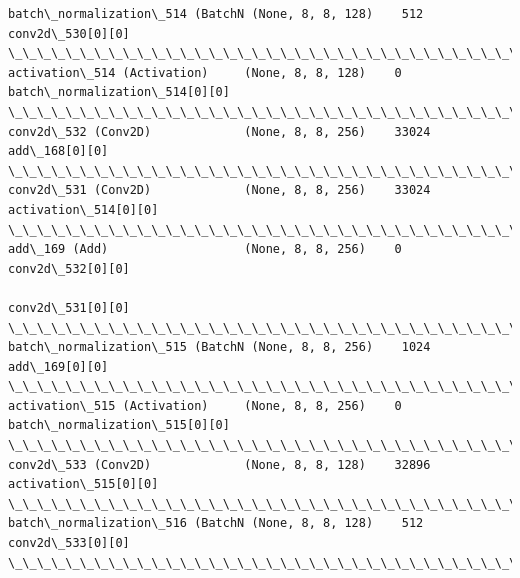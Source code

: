 \documentclass[11pt]{article}
\begin{document}
\begin{Verbatim}[commandchars=\\\{\}]
batch\_normalization\_514 (BatchN (None, 8, 8, 128)    512         conv2d\_530[0][0]                 
\_\_\_\_\_\_\_\_\_\_\_\_\_\_\_\_\_\_\_\_\_\_\_\_\_\_\_\_\_\_\_\_\_\_\_\_\_\_\_\_\_\_\_\_\_\_\_\_\_\_\_\_\_\_\_\_\_\_\_\_\_\_\_\_\_\_\_\_\_\_\_\_\_\_\_\_\_\_\_\_\_\_\_\_\_\_\_\_\_\_\_\_\_\_\_\_\_\_
activation\_514 (Activation)     (None, 8, 8, 128)    0           batch\_normalization\_514[0][0]    
\_\_\_\_\_\_\_\_\_\_\_\_\_\_\_\_\_\_\_\_\_\_\_\_\_\_\_\_\_\_\_\_\_\_\_\_\_\_\_\_\_\_\_\_\_\_\_\_\_\_\_\_\_\_\_\_\_\_\_\_\_\_\_\_\_\_\_\_\_\_\_\_\_\_\_\_\_\_\_\_\_\_\_\_\_\_\_\_\_\_\_\_\_\_\_\_\_\_
conv2d\_532 (Conv2D)             (None, 8, 8, 256)    33024       add\_168[0][0]                    
\_\_\_\_\_\_\_\_\_\_\_\_\_\_\_\_\_\_\_\_\_\_\_\_\_\_\_\_\_\_\_\_\_\_\_\_\_\_\_\_\_\_\_\_\_\_\_\_\_\_\_\_\_\_\_\_\_\_\_\_\_\_\_\_\_\_\_\_\_\_\_\_\_\_\_\_\_\_\_\_\_\_\_\_\_\_\_\_\_\_\_\_\_\_\_\_\_\_
conv2d\_531 (Conv2D)             (None, 8, 8, 256)    33024       activation\_514[0][0]             
\_\_\_\_\_\_\_\_\_\_\_\_\_\_\_\_\_\_\_\_\_\_\_\_\_\_\_\_\_\_\_\_\_\_\_\_\_\_\_\_\_\_\_\_\_\_\_\_\_\_\_\_\_\_\_\_\_\_\_\_\_\_\_\_\_\_\_\_\_\_\_\_\_\_\_\_\_\_\_\_\_\_\_\_\_\_\_\_\_\_\_\_\_\_\_\_\_\_
add\_169 (Add)                   (None, 8, 8, 256)    0           conv2d\_532[0][0]                 
                                                                 conv2d\_531[0][0]                 
\_\_\_\_\_\_\_\_\_\_\_\_\_\_\_\_\_\_\_\_\_\_\_\_\_\_\_\_\_\_\_\_\_\_\_\_\_\_\_\_\_\_\_\_\_\_\_\_\_\_\_\_\_\_\_\_\_\_\_\_\_\_\_\_\_\_\_\_\_\_\_\_\_\_\_\_\_\_\_\_\_\_\_\_\_\_\_\_\_\_\_\_\_\_\_\_\_\_
batch\_normalization\_515 (BatchN (None, 8, 8, 256)    1024        add\_169[0][0]                    
\_\_\_\_\_\_\_\_\_\_\_\_\_\_\_\_\_\_\_\_\_\_\_\_\_\_\_\_\_\_\_\_\_\_\_\_\_\_\_\_\_\_\_\_\_\_\_\_\_\_\_\_\_\_\_\_\_\_\_\_\_\_\_\_\_\_\_\_\_\_\_\_\_\_\_\_\_\_\_\_\_\_\_\_\_\_\_\_\_\_\_\_\_\_\_\_\_\_
activation\_515 (Activation)     (None, 8, 8, 256)    0           batch\_normalization\_515[0][0]    
\_\_\_\_\_\_\_\_\_\_\_\_\_\_\_\_\_\_\_\_\_\_\_\_\_\_\_\_\_\_\_\_\_\_\_\_\_\_\_\_\_\_\_\_\_\_\_\_\_\_\_\_\_\_\_\_\_\_\_\_\_\_\_\_\_\_\_\_\_\_\_\_\_\_\_\_\_\_\_\_\_\_\_\_\_\_\_\_\_\_\_\_\_\_\_\_\_\_
conv2d\_533 (Conv2D)             (None, 8, 8, 128)    32896       activation\_515[0][0]             
\_\_\_\_\_\_\_\_\_\_\_\_\_\_\_\_\_\_\_\_\_\_\_\_\_\_\_\_\_\_\_\_\_\_\_\_\_\_\_\_\_\_\_\_\_\_\_\_\_\_\_\_\_\_\_\_\_\_\_\_\_\_\_\_\_\_\_\_\_\_\_\_\_\_\_\_\_\_\_\_\_\_\_\_\_\_\_\_\_\_\_\_\_\_\_\_\_\_
batch\_normalization\_516 (BatchN (None, 8, 8, 128)    512         conv2d\_533[0][0]                 
\_\_\_\_\_\_\_\_\_\_\_\_\_\_\_\_\_\_\_\_\_\_\_\_\_\_\_\_\_\_\_\_\_\_\_\_\_\_\_\_\_\_\_\_\_\_\_\_\_\_\_\_\_\_\_\_\_\_\_\_\_\_\_\_\_\_\_\_\_\_\_\_\_\_\_\_\_\_\_\_\_\_\_\_\_\_\_\_\_\_\_\_\_\_\_\_\_\_

\end{Verbatim}
\end{document}
